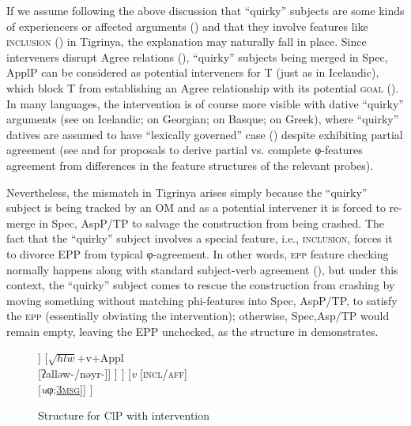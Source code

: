 \documentclass[output=paper]{langscibook}
\begin{document}
\noindent If we assume following the above discussion that ``quirky'' subjects are some kinds of experiencers or affected arguments (\citealt{mcginnis98}) and that they involve features like {\scshape inclusion} (\citealt{cowperandbjorkman2016}) in Tigrinya, the explanation may naturally fall in place. Since interveners disrupt Agree relations (\citealt{rezac2008}), ``quirky'' subjects being merged in Spec, ApplP can be considered as potential interveners for T (just as in Icelandic), which block T from establishing an Agree relationship with its potential {\scshape goal} (). In many languages, the intervention is of course more visible with dative ``quirky'' arguments (see \citealt{sigurandholm08} on Icelandic; \citealt{mcginnis98} on Georgian; \citealt{rezac2008} on Basque; \citealt{ana15} on Greek), where ``quirky'' datives are assumed to have ``lexically governed'' case (\citealt{marantz91}) despite exhibiting partial agreement (see \citealt{rezac2008} and \citealt{bejarandrezac09} for proposals to derive partial vs. complete φ-features agreement from differences in the feature structures of the relevant probes).

Nevertheless, the mismatch in Tigrinya arises simply because the ``quirky'' subject is being tracked by an OM and as a potential intervener it is forced to re-merge in Spec, AspP/TP to salvage the construction from being crashed. The fact that the ``quirky'' subject involves a special feature, i.e., {\scshape inclusion}, forces it to divorce EPP from typical φ-agreement. In other words, {\scshape epp} feature checking normally happens along with standard subject-verb agreement (\citealt{chomsky2001}), but under this context, the ``quirky'' subject comes to rescue the construction from crashing by moving something without matching phi-features into Spec, AspP/TP, to satisfy the {\scshape epp} (essentially obviating the intervention); otherwise, Spec,Asp/TP would remain empty, leaving the EPP unchecked, as the structure in  demonstrates. 

\begin{figure} 
\caption{Structure for ClP with intervention\label{fig:Gebregziabher:intervene}}
\begin{forest}
[\emph{v}P
		[ApplP  [DP{[iφ:\uline{\scshape 3msg}]}\\Yared]
			[Appl [DP  [three oxen,roof] ]
			      [$\sqrt{hlw}$$+$v$+$Appl\\{[ʔalləw-/nəyr-]}]
            ]
        ] 
        [\emph{v} {[{\scshape incl/aff}]}\\{[\emph{u}φ:\uline{\scshape 3msg}]}]
]
\end{forest}
\end{figure} 
\end{document}
